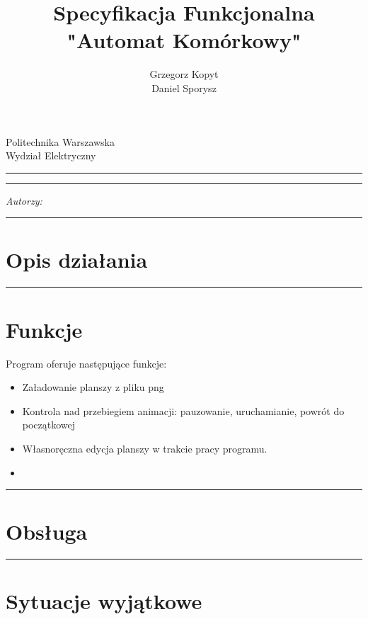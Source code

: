 \documentclass[a4paper,11pt]{article}
\author{Grzegorz Kopyt\\
Daniel Sporysz}
\title{Specyfikacja Funkcjonalna \\
"Automat Komórkowy"}
\makeatletter
\newcommand{\linia}{\rule{\linewidth}{0.4mm}}
\renewcommand{\maketitle}{\begin{titlepage}
    \vspace*{2cm}
    \begin{center}\LARGE
    Politechnika Warszawska\\
    Wydział Elektryczny\\
    \end{center}
    \vspace{5cm}
    \noindent\linia
    \begin{center}
      \LARGE \textsc{\@title}
         \end{center}
     \linia
    \vspace{0.5cm}
    \begin{flushright}
    \begin{minipage}{5cm}
    \textit{Autorzy:}\\
    \normalsize \textsc{\@author} \par
    \end{minipage}
    \vspace{5cm}
     \end{flushright}
    \vspace*{\stretch{6}}
    \begin{center}
    \@date
    \end{center}
  \end{titlepage}%
}
\makeatother
\begin{document}
\maketitle


\tableofcontents
\vspace{1cm}
\noindent\linia
\section{Opis działania}


\noindent\linia
\section{Funkcje}
Program oferuje następujące funkcje:
\begin{itemize}
\item Załadowanie planszy z pliku png
\item Kontrola nad przebiegiem animacji: pauzowanie, uruchamianie, powrót do początkowej
\item Własnoręczna edycja planszy w trakcie pracy programu.
\item 
\end{itemize}



\noindent\linia
\section{Obsługa}



\noindent\linia
\section{Sytuacje wyjątkowe}
\end{document}
